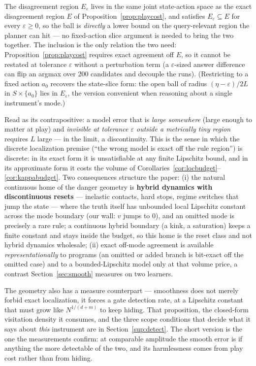 \documentclass[11pt]{article}
\theoremstyle{definition}
\theoremstyle{remark}
\begin{document}
The disagreement region $E_\varepsilon$ lives in the same joint state-action space as the exact disagreement region $E$ of Proposition~\ref{prop:playcost}, and satisfies $E_\varepsilon \subseteq E$ for every $\varepsilon \geq 0$, so the ball is \emph{directly} a lower bound on the query-relevant region the planner can hit --- no fixed-action slice argument is needed to bring the two together. The inclusion is the only relation the two need: Proposition~\ref{prop:playcost} requires exact agreement off $E$, so it cannot be restated at tolerance $\varepsilon$ without a perturbation term (a $\varepsilon$-sized answer difference can flip an argmax over 200 candidates and decouple the runs). (Restricting to a fixed action $a_0$ recovers the state-slice form: the open ball of radius $(\eta-\varepsilon)/2L$ in $S \times \{a_0\}$ lies in $E_\varepsilon$, the version convenient when reasoning about a single instrument's mode.)

Read as its contrapositive: a model error that is \emph{large somewhere} (large enough to matter at play) and \emph{invisible at tolerance $\varepsilon$ outside a metrically tiny region} requires $L$ large --- in the limit, a discontinuity. This is the sense in which the discrete localization premise (``the wrong model is exact off the rule region'') is discrete: in its exact form it is unsatisfiable at any finite Lipschitz bound, and in its approximate form it costs the volume of Corollaries~\ref{cor:locbudget}--\ref{cor:kappabudget}. Two consequences structure the paper: (i) the natural continuous home of the danger geometry is \textbf{hybrid dynamics with discontinuous resets} --- inelastic contacts, hard stops, regime switches that jump the state --- where the truth itself has unbounded local Lipschitz constant across the mode boundary (our wall: $v$ jumps to 0), and an omitted mode is precisely a rare rule; a continuous hybrid boundary (a kink, a saturation) keeps a finite constant and stays inside the budget, so this home is the reset class and not hybrid dynamics wholesale; (ii) exact off-mode agreement is available \emph{representationally} to programs (an omitted or added branch is bit-exact off the omitted case) and to a bounded-Lipschitz model only at that volume price, a contrast Section~\ref{sec:smooth} measures on two learners.

The geometry also has a measure counterpart --- smoothness does not merely forbid exact localization, it forces a gate detection rate, at a Lipschitz constant that must grow like $N^{1/(d+m)}$ to keep hiding. That proposition, the closed-form visitation density it consumes, and the three scope conditions that decide what it says about \emph{this} instrument are in Section~\ref{sup:detect}. The short version is the one the measurements confirm: at comparable amplitude the smooth error is if anything the more detectable of the two, and its harmlessness comes from play cost rather than from hiding.
\end{document}
